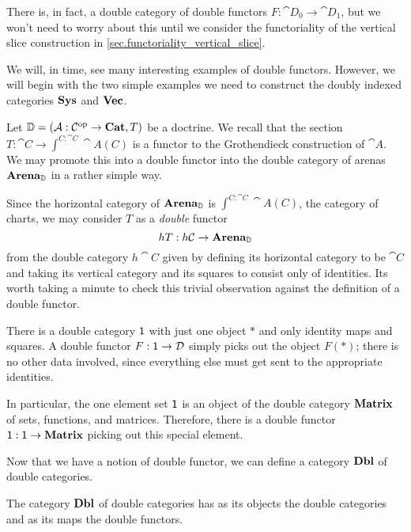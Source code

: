 \documentclass[DynamicalBook]{subfiles}
\begin{document}
\begin{remark}
There is, in fact, a double category of double functors $F : \cat{D}_0 \to
\cat{D}_1$, but we won't need to worry about this until we consider the
functoriality of the vertical slice construction in \cref{sec.functoriality_vertical_slice}.
\end{remark}

We will, in time, see many interesting examples of double functors. However, we
will begin with the two simple examples we need to
construct the doubly indexed categories $\textbf{Sys}$ and $\textbf{Vec}$.

\begin{example}\label{ex.double_functor_section}
Let $\mathbb{D} = (\mathcal{A} : \mathcal{C}^{\textnormal{op}} \to \textbf{Cat}, T)$ be a doctrine. We
recall that the section $T : \cat{C} \to \int^{C : \cat{C}}\cat{A}(C)$ is a functor to the
Grothendieck construction of $\cat{A}$. We may promote this into a double
functor into the double category of arenas $\textbf{Arena}_{\mathbb{D}}$ in a
rather simple way.

Since the horizontal category of $\textbf{Arena}_{\mathbb{D}}$ is $\int^{C : \cat{C}}
\cat{A}(C)$, the category of charts, we may consider $T$ as a \emph{double}
functor
$$hT : h\mathcal{C} \to \textbf{Arena}_{\mathbb{D}}$$
from the double category $h\cat{C}$ given by defining its horizontal category to
be $\cat{C}$ and taking its vertical category and its squares to consist only of
identities. Its worth taking a minute to check this trivial observation against
the definition of a double functor.
\end{example}

\begin{example}\label{ex.double_functor_one}
There is a double category $\mathsf{1}$ with just one object $\ast$ and only identity maps
and squares. A double functor $F : \mathsf{1} \to \mathcal{D}$ simply picks out the
object $F(\ast)$; there is no other data involved, since everything else must
get sent to the appropriate identities.

In particular, the one element set $\mathsf{1}$ is an object of the double category
$\textbf{Matrix}$ of sets, functions, and matrices. Therefore, there is a double
functor $\mathsf{1} : \mathsf{1} \to \textbf{Matrix}$ picking out this special element.
\end{example}

Now that we have a notion of double functor, we can define a category
$\textbf{Dbl}$ of double categories.
\begin{definition}\label{def.category_of_double_cats}
The category $\textbf{Dbl}$ of double categories has as its objects the double
categories and as its maps the double functors.
\end{definition}
\end{document}
